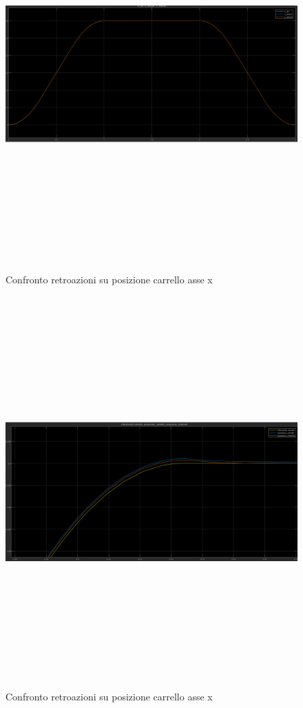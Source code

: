 \documentclass{article}
\begin{document}
\begin{figure}[H]
\centering
\includegraphics[width=13cm,height=15cm,keepaspectratio]{./simulink/ldm_variabile/PIDX_POSIZIONE}
\caption{Confronto retroazioni su posizione carrello asse x}
\end{figure}

\begin{figure}[H]
\centering
\includegraphics[width=13cm,height=15cm,keepaspectratio]{./simulink/ldm_variabile/PIDX_POSIZIONEZOOM}
\caption{Confronto retroazioni su posizione carrello asse x}
\end{figure}
\end{document}
